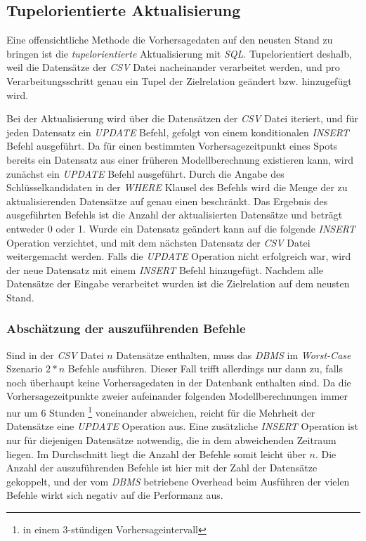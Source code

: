 \subsection{Tupelorientierte Aktualisierung}

Eine offensichtliche Methode die Vorhersagedaten auf den neusten Stand
zu bringen ist die \textit{tupelorientierte} Aktualisierung mit
\textit{SQL}. Tupelorientiert deshalb, weil die Datensätze der
\textit{CSV} Datei nacheinander verarbeitet werden, und pro
Verarbeitungsschritt genau ein Tupel der Zielrelation geändert
bzw. hinzugefügt wird. 

Bei der Aktualisierung wird über die Datensätzen der \textit{CSV}
Datei iteriert, und für jeden Datensatz ein \textit{UPDATE} Befehl,
gefolgt von einem konditionalen \textit{INSERT} Befehl ausgeführt. Da
für einen bestimmten Vorhersagezeitpunkt eines Spots bereits ein
Datensatz aus einer früheren Modellberechnung existieren kann, wird
zunächst ein \textit{UPDATE} Befehl ausgeführt. Durch die Angabe des
Schlüsselkandidaten in der \textit{WHERE} Klausel des Befehls wird die
Menge der zu aktualisierenden Datensätze auf genau einen
beschränkt. Das Ergebnis des ausgeführten Befehls ist die Anzahl der
aktualisierten Datensätze und beträgt entweder 0 oder 1. Wurde ein
Datensatz geändert kann auf die folgende \textit{INSERT} Operation
verzichtet, und mit dem nächsten Datensatz der \textit{CSV} Datei
weitergemacht werden. Falls die \textit{UPDATE} Operation nicht
erfolgreich war, wird der neue Datensatz mit einem \textit{INSERT}
Befehl hinzugefügt. Nachdem alle Datensätze der Eingabe verarbeitet
wurden ist die Zielrelation auf dem neusten Stand.

\subsubsection{Abschätzung der auszuführenden Befehle}
Sind in der \textit{CSV} Datei $n$ Datensätze enthalten, muss das
\textit{DBMS} im \textit{Worst-Case} Szenario $2 * n$ Befehle
ausführen. Dieser Fall trifft allerdings nur dann zu, falls noch
überhaupt keine Vorhersagedaten in der Datenbank enthalten sind. Da
die Vorhersagezeitpunkte zweier aufeinander folgenden
Modellberechnungen immer nur um 6 Stunden \footnote{in einem
  3-stündigen Vorhersageintervall} voneinander abweichen, reicht für
die Mehrheit der Datensätze eine \textit{UPDATE} Operation aus. Eine
zusätzliche \textit{INSERT} Operation ist nur für diejenigen
Datensätze notwendig, die in dem abweichenden Zeitraum liegen. Im
Durchschnitt liegt die Anzahl der Befehle somit leicht über $n$. Die
Anzahl der auszuführenden Befehle ist hier mit der Zahl der Datensätze
gekoppelt, und der vom \textit{DBMS} betriebene Overhead beim
Ausführen der vielen Befehle wirkt sich negativ auf die Performanz
aus.

